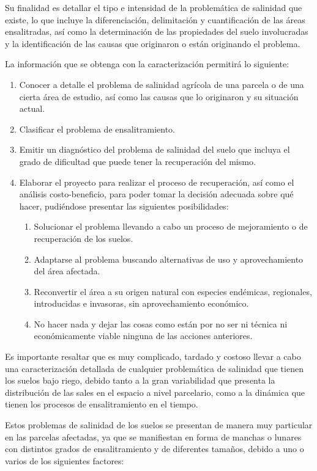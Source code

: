 Su finalidad es detallar el tipo e intensidad de la problemática de salinidad que existe, lo que incluye la diferenciación, delimitación y cuantificación de las áreas ensalitradas, así como la determinación de las propiedades del suelo involucradas y la identificación de las causas que originaron o están originando el problema.

La información que se obtenga con la caracterización permitirá lo
siguiente:
\begin{enumerate}
    \item Conocer a detalle el problema de salinidad agrícola de una parcela o de una cierta área de estudio, así como las causas que lo originaron y su situación actual.
    \item Clasificar el problema de ensalitramiento.
    \item Emitir un diagnóstico del problema de salinidad del suelo que incluya el grado de dificultad que puede tener la recuperación del mismo.
    \item Elaborar el proyecto para realizar el proceso de recuperación, así como el análisis costo-beneficio, para poder tomar la decisión adecuada sobre qué hacer, pudiéndose presentar las siguientes posibilidades: \begin{enumerate}
        \item Solucionar el problema llevando a cabo un proceso de mejoramiento o de recuperación de los suelos.
        \item Adaptarse al problema buscando alternativas de uso y aprovechamiento del área afectada.
        \item Reconvertir el área a su origen natural con especies endémicas, regionales, introducidas e invasoras, sin aprovechamiento económico.
        \item No hacer nada y dejar las cosas como están por no ser ni técnica ni económicamente viable ninguna de las acciones anteriores.        
    \end{enumerate}
\end{enumerate}
Es importante resaltar que es muy complicado, tardado y costoso llevar a cabo una caracterización detallada de cualquier problemática de salinidad que tienen los suelos bajo riego, debido tanto a la gran variabilidad que presenta la distribución de las sales en el espacio a nivel parcelario, como a la dinámica que tienen los procesos de ensalitramiento en el tiempo.

Estos problemas de salinidad de los suelos se presentan de manera muy particular en las parcelas afectadas, ya que se manifiestan en forma de manchas o lunares con distintos grados de ensalitramiento y de diferentes tamaños, debido a uno o varios de los siguientes factores:

